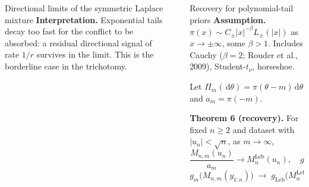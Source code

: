 \documentclass[final]{beamer}
\newcommand{\dd}{\,\mathrm{d}}
\newcommand{\Leb}{\mathrm{Leb}}
\newcommand{\thetahat}{\widehat{\theta}_n}
\newlength{\sepwidth}
\newlength{\colwidth}
\newcommand{\separatorcolumn}{\begin{column}{\sepwidth}\end{column}}
\begin{document}
\begin{frame}[t]
\begin{columns}[t]
\begin{column}{\colwidth}
\begin{alertblock}{Directional limits of the symmetric Laplace mixture}
    \vspace{0.1cm}
    \textbf{Interpretation.} Exponential tails decay too fast for the conflict to be absorbed: a residual directional signal of rate $1/r$ survives in the limit. This is the borderline case in the trichotomy.
  \end{alertblock}

\end{column}

\separatorcolumn

\begin{column}{\colwidth}




  \begin{alertblock}{Recovery for polynomial-tail priors}
    \textbf{Assumption.} $\pi(x)\sim C_\pm |x|^{-\beta}L_\pm(|x|)$ as $x\to\pm\infty$, some $\beta>1$.
    Includes Cauchy ($\beta=2$; Rouder et al., 2009), Student-$t_\nu$, horseshoe.

    Let $\Pi_m(\dd\theta)=\pi(\theta-m)\dd\theta$ and $a_m=\pi(-m)$.

    \vspace{0.15cm}
    \textbf{Theorem 6 (recovery).} For fixed $n\ge 2$ and dataset with $|u_n|<\sqrt n$, as $m\to\infty$,
    \[
      \frac{M_{n,m}(u_n)}{a_m} \to M_n^{\Leb}(u_n),
      \quad
      g_m(a_m c) \to g_{\Leb}(c),
    \]
    \[
      g_m\!\bigl(M_{n,m}(y_{1:n})\bigr) \;\longrightarrow\; g_{\Leb}\!\bigl(M_n^{\Leb}(y_{1:n})\bigr) \;=\; P_n^{\Leb}(y_{1:n}).
    \]


\end{alertblock}
\end{column}
\end{columns}
\end{frame}
\end{document}
